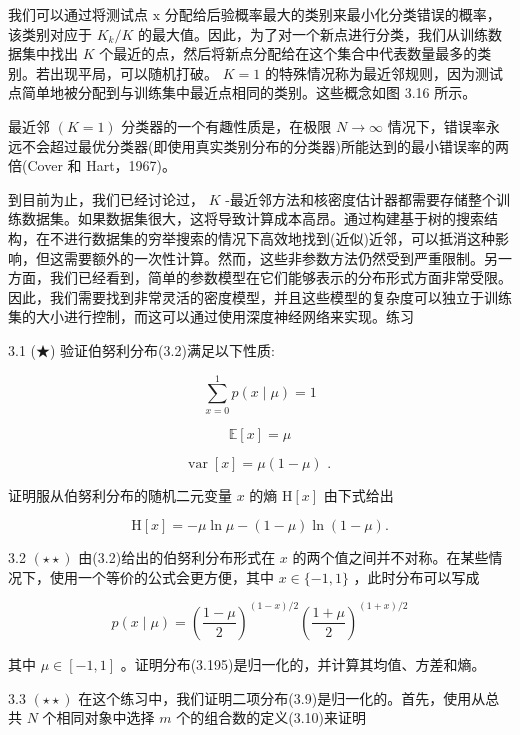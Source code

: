 \documentclass[10pt]{report}
\begin{document}
我们可以通过将测试点 \(\mathrm{x}\) 分配给后验概率最大的类别来最小化分类错误的概率，该类别对应于 \({K}_{k}/K\) 的最大值。因此，为了对一个新点进行分类，我们从训练数据集中找出 \(K\) 个最近的点，然后将新点分配给在这个集合中代表数量最多的类别。若出现平局，可以随机打破。 \(K = 1\) 的特殊情况称为最近邻规则，因为测试点简单地被分配到与训练集中最近点相同的类别。这些概念如图 3.16 所示。

最近邻 \(\left( {K = 1}\right)\) 分类器的一个有趣性质是，在极限 \(N \rightarrow  \infty\) 情况下，错误率永远不会超过最优分类器(即使用真实类别分布的分类器)所能达到的最小错误率的两倍(Cover 和 Hart，1967)。

到目前为止，我们已经讨论过， \(K\) -最近邻方法和核密度估计器都需要存储整个训练数据集。如果数据集很大，这将导致计算成本高昂。通过构建基于树的搜索结构，在不进行数据集的穷举搜索的情况下高效地找到(近似)近邻，可以抵消这种影响，但这需要额外的一次性计算。然而，这些非参数方法仍然受到严重限制。另一方面，我们已经看到，简单的参数模型在它们能够表示的分布形式方面非常受限。因此，我们需要找到非常灵活的密度模型，并且这些模型的复杂度可以独立于训练集的大小进行控制，而这可以通过使用深度神经网络来实现。练习

3.1 (★) 验证伯努利分布(3.2)满足以下性质:

\[
\mathop{\sum }\limits_{{x = 0}}^{1}p\left( {x \mid  \mu }\right)  = 1 \tag{3.191}
\]

\[
\mathbb{E}\left\lbrack  x\right\rbrack   = \mu  \tag{3.192}
\]

\[
\operatorname{var}\left\lbrack  x\right\rbrack   = \mu \left( {1 - \mu }\right) \text{ . } \tag{3.193}
\]

证明服从伯努利分布的随机二元变量 \(x\) 的熵 \(\mathrm{H}\left\lbrack  x\right\rbrack\) 由下式给出

\[
\mathrm{H}\left\lbrack  x\right\rbrack   =  - \mu \ln \mu  - \left( {1 - \mu }\right) \ln \left( {1 - \mu }\right) . \tag{3.194}
\]

3.2 \(\left( {\star  \star  }\right)\) 由(3.2)给出的伯努利分布形式在 \(x\) 的两个值之间并不对称。在某些情况下，使用一个等价的公式会更方便，其中 \(x \in  \{  - 1,1\}\) ，此时分布可以写成

\[
p\left( {x \mid  \mu }\right)  = {\left( \frac{1 - \mu }{2}\right) }^{\left( {1 - x}\right) /2}{\left( \frac{1 + \mu }{2}\right) }^{\left( {1 + x}\right) /2} \tag{3.195}
\]

其中 \(\mu  \in  \left\lbrack  {-1,1}\right\rbrack\) 。证明分布(3.195)是归一化的，并计算其均值、方差和熵。

3.3 \(\left( {\star  \star  }\right)\) 在这个练习中，我们证明二项分布(3.9)是归一化的。首先，使用从总共 \(N\) 个相同对象中选择 \(m\) 个的组合数的定义(3.10)来证明
\end{document}
